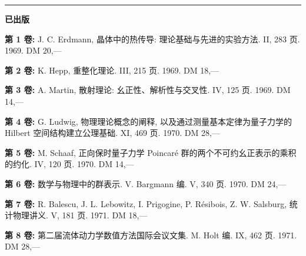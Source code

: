 \begingroup
\sffamily\fontsize{8}{10.5}\selectfont
\setlength{\parindent}{0pt}\setlength{\parskip}{4pt}
\par\vspace{3pt}\hrule\vspace{4pt}
\textbf{已出版}\par
\noindent\begin{minipage}[t]{.49\linewidth}
\textbf{第 1 卷:} J. C. Erdmann, 晶体中的热传导: 理论基础与先进的实验方法. II, 283 页. 1969. DM 20,—\par
\textbf{第 2 卷:} K. Hepp, 重整化理论. III, 215 页. 1969. DM 18,—\par
\textbf{第 3 卷:} A. Martin, 散射理论: 幺正性、解析性与交叉性. IV, 125 页. 1969. DM 14,—\par
\textbf{第 4 卷:} G. Ludwig, 物理理论概念的阐释, 以及通过测量基本定律为量子力学的 Hilbert 空间结构建立公理基础. XI, 469 页. 1970. DM 28,—\par
\textbf{第 5 卷:} M. Schaaf, 正向保时量子力学 Poincaré 群的两个不可约幺正表示的乘积的约化. IV, 120 页. 1970. DM 14,—\par
\textbf{第 6 卷:} 数学与物理中的群表示. V. Bargmann 编. V, 340 页. 1970. DM 24,—\par
\textbf{第 7 卷:} R. Balescu, J. L. Lebowitz, I. Prigogine, P. Résibois, Z. W. Salsburg, 统计物理讲义. V, 181 页. 1971. DM 18,—\par
\textbf{第 8 卷:} 第二届流体动力学数值方法国际会议文集. M. Holt 编. IX, 462 页. 1971. DM 28,—\par
\end{minipage}
\endgroup
